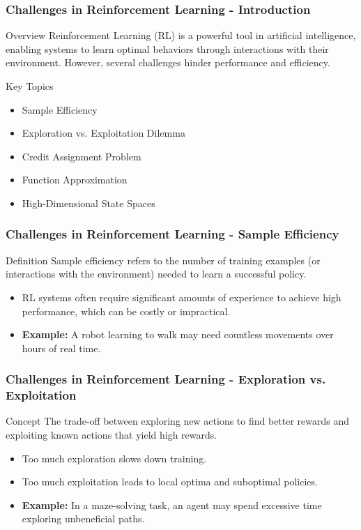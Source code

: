 \documentclass[aspectratio=169]{beamer}
\begin{document}
\begin{frame}[fragile]
    \frametitle{Challenges in Reinforcement Learning - Introduction}
    \begin{block}{Overview}
        Reinforcement Learning (RL) is a powerful tool in artificial intelligence, enabling systems to learn optimal behaviors through interactions with their environment. However, several challenges hinder performance and efficiency.
    \end{block}
    \begin{block}{Key Topics}
        \begin{itemize}
            \item Sample Efficiency
            \item Exploration vs. Exploitation Dilemma
            \item Credit Assignment Problem
            \item Function Approximation
            \item High-Dimensional State Spaces
        \end{itemize}
    \end{block}
\end{frame}

\begin{frame}[fragile]
    \frametitle{Challenges in Reinforcement Learning - Sample Efficiency}
    \begin{block}{Definition}
        Sample efficiency refers to the number of training examples (or interactions with the environment) needed to learn a successful policy.
    \end{block}
    \begin{itemize}
        \item RL systems often require significant amounts of experience to achieve high performance, which can be costly or impractical.
        \item \textbf{Example:} A robot learning to walk may need countless movements over hours of real time.
    \end{itemize}
\end{frame}

\begin{frame}[fragile]
    \frametitle{Challenges in Reinforcement Learning - Exploration vs. Exploitation}
    \begin{block}{Concept}
        The trade-off between exploring new actions to find better rewards and exploiting known actions that yield high rewards.
    \end{block}
    \begin{itemize}
        \item Too much exploration slows down training.
        \item Too much exploitation leads to local optima and suboptimal policies.
        \item \textbf{Example:} In a maze-solving task, an agent may spend excessive time exploring unbeneficial paths.
    \end{itemize}
\end{frame}
\end{document}

